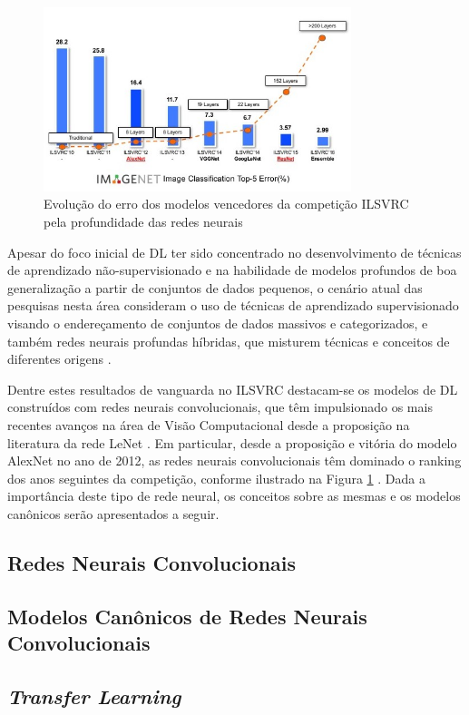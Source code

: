 \begin{figure}[ht]
	\centering
	\caption{Evolução do erro dos modelos vencedores da competição ILSVRC pela profundidade das redes neurais \cite{dl_ILSVRC, ImagenetChall}}
	\label{fig:compara_redes_ilsvrc}
	\includegraphics[width=0.8\textwidth]{img/compara_redes_ilsvrc.png}
\end{figure}

Apesar do foco inicial de DL ter sido concentrado no desenvolvimento de técnicas de aprendizado não-supervisionado e na habilidade de modelos profundos de boa generalização a partir de conjuntos de dados pequenos, o cenário atual das pesquisas nesta área consideram o uso de técnicas de aprendizado supervisionado visando o endereçamento de conjuntos de dados massivos e categorizados, e também redes neurais profundas híbridas, que misturem técnicas e conceitos de diferentes origens \cite{deng2014deep,goodfellow2016deep}.

Dentre estes resultados de vanguarda no ILSVRC destacam-se os modelos de DL construídos com redes neurais convolucionais, que têm impulsionado os mais recentes avanços na área de Visão Computacional desde a proposição na literatura da rede LeNet \cite{lenet}. Em particular, desde a proposição e vitória do modelo AlexNet \cite{alexnet} no ano de 2012, as redes neurais convolucionais têm dominado o ranking dos anos seguintes da competição, conforme ilustrado na Figura \ref{fig:compara_redes_ilsvrc} \cite{deng2014deep}. Dada a importância deste tipo de rede neural, os conceitos sobre as mesmas e os modelos canônicos serão apresentados a seguir.


\subsection{Redes Neurais Convolucionais} \label{subsubsec:rnc}


\subsection{Modelos Canônicos de Redes Neurais Convolucionais} \label{subsubsec:modelos_canonicos}


\subsection{\emph{Transfer Learning}}

